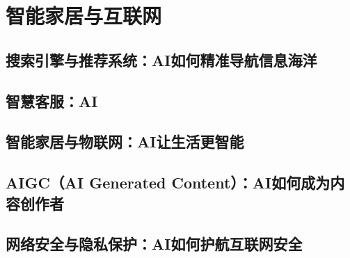 \setchapterpreamble[u]{\margintoc}
\chapter{智能家居与互联网}

\section{搜索引擎与推荐系统：AI如何精准导航信息海洋}

\section{智慧客服：AI}

\section{智能家居与物联网：AI让生活更智能}

\section{AIGC（AI Generated Content）：AI如何成为内容创作者}

\section{网络安全与隐私保护：AI如何护航互联网安全}

